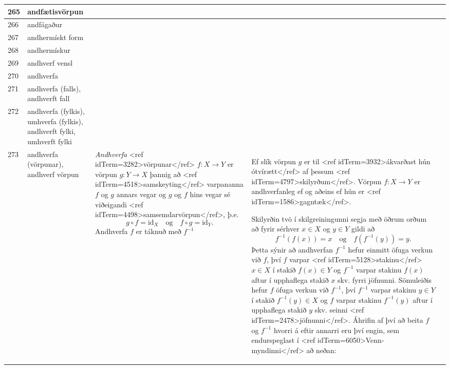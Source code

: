 \begin{longtable}{p{}|p{}|p{}|p{}|p{}}
\hline
265 & andfætisvörpun &  &  &  \\
\hline
266 & andfágaður &  &  &  \\
\hline
267 & andhermískt form &  &  &  \\
\hline
268 & andhermískur &  &  &  \\
\hline
269 & andhverf vensl &  &  &  \\
\hline
270 & andhverfa &  &  &  \\
\hline
271 & andhverfa (falls), andhverft fall &  &  &  \\
\hline
272 & andhverfa (fylkis), umhverfa (fylkis), andhverft fylki, umhverft fylki &  &  &  \\
\hline
273 & andhverfa (vörpunar), andhverf vörpun & \textit{Andhverfa} <ref idTerm=3282>vörpunar</ref> $f: X \to Y$ er vörpun $g: Y \to X$ þannig að <ref idTerm=4518>samskeyting</ref> varpananna $f$ og $g$ annars vegar og $g$ og $f$ hins vegar sé viðeigandi <ref idTerm=4498>samsemdarvörpun</ref>, þ.e. \[ g \circ f = \mathrm{id}_X \quad \text{og} \quad f \circ g = \mathrm{id}_Y. \] Andhverfa $f$ er táknuð með $f^{-1}$ & Ef slík vörpun $g$ er til <ref idTerm=3932>ákvarðast hún ótvírætt</ref> af þessum <ref idTerm=4797>skilyrðum</ref>. Vörpun $f: X \to Y$ er andhverfanleg ef og aðeins ef hún er <ref idTerm=1586>gagntæk</ref>.

Skilyrðin tvö í skilgreiningunni segja með öðrum orðum að fyrir sérhver $x \in X$ og $y \in Y$ gildi að \[ f^{-1}(f(x)) = x \quad \text{og} \quad f(f^{-1}(y)) = y. \] Þetta sýnir að andhverfan $f^{-1}$ hefur einmitt öfuga verkun við $f$, því $f$ varpar <ref idTerm=5128>stakinu</ref> $x \in X$ í stakið $f(x) \in Y$ og $f^{-1}$ varpar stakinu $f(x)$ aftur í upphaflega stakið $x$ skv. fyrri jöfnunni. Sömuleiðis hefur $f$ öfuga verkun við $f^{-1}$, því $f^{-1}$ varpar stakinu $y \in Y$ í stakið $f^{-1}(y) \in X$ og $f$ varpar stakinu $f^{-1}(y)$ aftur í upphaflega stakið $y$ skv. seinni <ref idTerm=2478>jöfnunni</ref>. Áhrifin af því að beita $f$ og $f^{-1}$ hvorri á eftir annarri eru því engin, sem endurspeglast í <ref idTerm=6050>Venn-myndinni</ref> að neðan:


\end{longtable}
